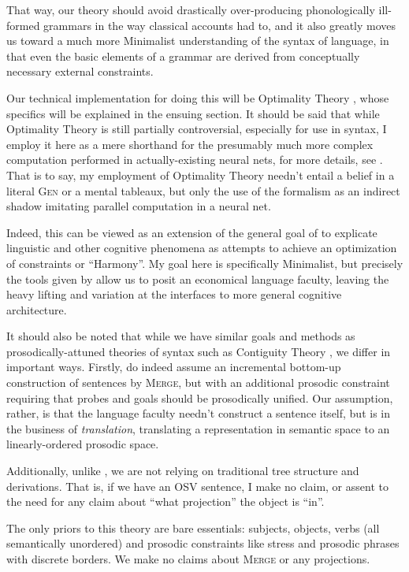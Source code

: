 \documentclass{article}
\begin{document}
That way, our theory should avoid drastically over-producing phonologically ill-formed grammars in the way classical accounts had to, and it also greatly moves us toward a much more Minimalist understanding of the syntax of language, in that even the basic elements of a grammar are derived from conceptually necessary external constraints.

Our technical implementation for doing this will be Optimality Theory \parencite{prince93}, whose specifics will be explained in the ensuing section.
It should be said that while Optimality Theory is still partially controversial, especially for use in syntax, I employ it here as a mere shorthand for the presumably much more complex computation performed in actually-existing neural nets, for more details, see \textcite{prince97}.
That is to say, my employment of Optimality Theory needn't entail a belief in a literal {\textsc{Gen}} or a mental tableaux, but only the use of the formalism as an indirect shadow imitating parallel computation in a neural net.

Indeed, this can be viewed as an extension of the general goal of \textcite{smolensky06} to explicate linguistic and other cognitive phenomena as attempts to achieve an optimization of constraints or ``Harmony''.
My goal here is specifically Minimalist, but precisely the tools given by \textcite{smolensky06} allow us to posit an economical language faculty, leaving the heavy lifting and variation at the interfaces to more general cognitive architecture.

It should also be noted that while we have similar goals and methods as prosodically-attuned theories of syntax such as Contiguity Theory \parencite{richards16}, we differ in important ways.
Firstly, \textcite{richards10,richards16} do indeed assume an incremental bottom-up construction of sentences by \textsc{Merge}, but with an additional prosodic constraint requiring that probes and goals should be prosodically unified.
Our assumption, rather, is that the language faculty needn't construct a sentence itself, but is in the business of \textit{translation}, translating a representation in semantic space to an linearly-ordered prosodic space.

Additionally, unlike \textcite{richards16}, we are not relying on traditional tree structure and derivations.
That is, if we have an OSV sentence, I make no claim, or assent to the need for any claim about ``what projection'' the object is ``in''.

The only priors to this theory are bare essentials: subjects, objects, verbs (all semantically unordered) and prosodic constraints like stress and prosodic phrases with discrete borders.
We make no claims about \textsc{Merge} or any projections.
\end{document}
